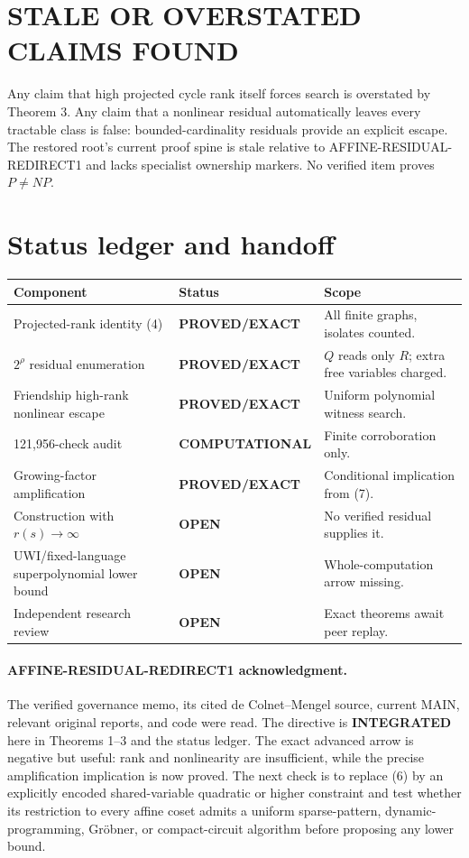 \documentclass[11pt]{article}
\newcommand{\EXACT}{\textbf{PROVED/EXACT}}
\newcommand{\COMP}{\textbf{COMPUTATIONAL}}
\newcommand{\OPEN}{\textbf{OPEN}}
\begin{document}
\section{STALE OR OVERSTATED CLAIMS FOUND}
Any claim that high projected cycle rank itself forces search is overstated by
Theorem 3.  Any claim that a nonlinear residual automatically leaves every
tractable class is false: bounded-cardinality residuals provide an explicit
escape.  The restored root's current proof spine is stale relative to
AFFINE-RESIDUAL-REDIRECT1 and lacks specialist ownership markers.  No verified
item proves $P\ne NP$.

\section{Status ledger and handoff}
\begin{center}\small
\begin{tabularx}{\textwidth}{@{}l l X@{}}
\toprule
Component & Status & Scope\\
\midrule
Projected-rank identity (4) & \EXACT & All finite graphs, isolates counted.\\
$2^\rho$ residual enumeration & \EXACT & $Q$ reads only $R$; extra free variables charged.\\
Friendship high-rank nonlinear escape & \EXACT & Uniform polynomial witness search.\\
121,956-check audit & \COMP & Finite corroboration only.\\
Growing-factor amplification & \EXACT & Conditional implication from (7).\\
Construction with $r(s)\to\infty$ & \OPEN & No verified residual supplies it.\\
UWI/fixed-language superpolynomial lower bound & \OPEN & Whole-computation arrow missing.\\
Independent research review & \OPEN & Exact theorems await peer replay.\\
\bottomrule
\end{tabularx}
\end{center}

\paragraph{AFFINE-RESIDUAL-REDIRECT1 acknowledgment.}
The verified governance memo, its cited de Colnet--Mengel source, current
MAIN, relevant original reports, and code were read.  The directive is
\textbf{INTEGRATED} here in Theorems 1--3 and the status ledger.  The exact
advanced arrow is negative but useful: rank and nonlinearity are insufficient,
while the precise amplification implication is now proved.  The next check is
to replace (6) by an explicitly encoded shared-variable quadratic or higher
constraint and test whether its restriction to every affine coset admits a
uniform sparse-pattern, dynamic-programming, Gröbner, or compact-circuit
algorithm before proposing any lower bound.
\end{document}
